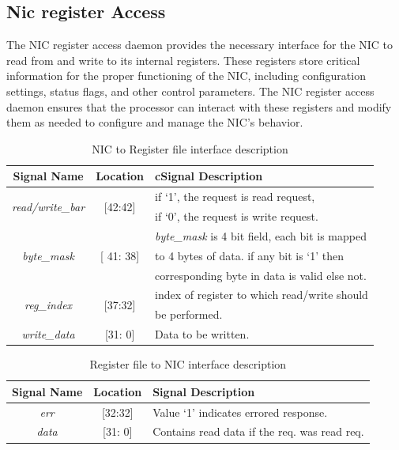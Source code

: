 \documentclass[12pt]{report}
\begin{document}
	

		\subsection{Nic register Access}
				The NIC register access daemon provides the necessary interface for the NIC to read from and write to its internal registers. These registers store critical information for the proper functioning of the NIC, including configuration settings, status flags, and other control parameters. The NIC register access daemon ensures that the processor can interact with these registers and modify them as needed to configure and manage the NIC's behavior.\\
		\begin{table}[!htbp]
					\centering
					\begin{tabular}{ccl}
						\hline
						\textbf{Signal Name} 			& \textbf{Location} 		&{c}\textbf{Signal Description}  \\ \hline
						\multirow{2}{*}{\textit{read/write\_bar}}& \multirow{2}{*}{[42:42]}	& if `1', the request is read request,\\ 
											& 				& if `0', the request is write request.\\ \hline
						\multirow{3}{*}{\textit{byte\_mask}}	& \multirow{3}{*}{[ 41: 38]}	& \textit{byte\_mask} is 4 bit field, each bit is mapped\\
											&				& to 4 bytes of data. if any bit is `1' then\\
											& 				& corresponding byte in data is valid else not.\\ \hline 
						\multirow{2}{*}{\textit{reg\_index}}   	& \multirow{2}{*}{[37:32]} 	& index of register to which read/write should\\ 
											&				& be performed.\\ \hline
						\textit{write\_data}   			& [31: 0] 			& Data to be written.\\ \hline
					\end{tabular}
					\caption{NIC to Register file interface description}
					\label{tab:NIC-Reg-interface-req}
				\end{table}

				\begin{table}[!htbp]
					\centering
					\begin{tabular}{ccl}
						\hline
						\textbf{Signal Name} 		& \textbf{Location} 		&\textbf{Signal Description}  \\ \hline
						\textit{err}			& [32:32]			& Value `1' indicates errored response.\\\hline
						\textit{data}   		& [31: 0] 			& Contains read data if the req. was read req.\\ \hline
					\end{tabular}
					\caption{ Register file to NIC interface description}
					\label{tab:Reg-NIC-interface-resp}
				\end{table}
\end{document}
